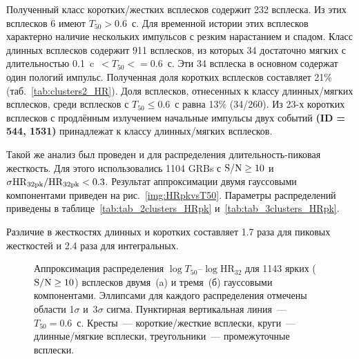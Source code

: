 Полученный класс коротких/жестких всплесков содержит 232 всплеска. Из этих 
всплесков 6 имеют $T_{50} > 0.6$~с. Для временной истории этих всплесков характерно 
наличие нескольких импульсов с резким нарастанием и спадом.  Класс длинных всплесков 
содержит 911 всплесков, из которых 34 достаточно мягких с длительностью 0.1~c~$< T_{50} <=0.6$~с. 
Эти 34 всплеска в основном содержат один пологий импульс. Полученная доля коротких 
всплесков составляет 21\% (таб.~\ref{tab:clusters2_HR}). Доля всплесков, отнесенных 
к классу длинных/мягких всплесков, среди всплесков с $T_{50} \leq 0.6$~с  равна 13\% (34/260). 
Из 23-х коротких всплесков с продлённым излучением начальные импульсы двух 
событий \textbf{(ID = 544, 1531)} принадлежат к классу длинных/мягких всплесков.

Такой же анализ был проведен и для распределения длительность-пиковая жесткость. 
Для этого использовались 1104 GRBs с ${\mathrm{S/N}} \geq 10$ и $\sigma {\mathrm{HR}}_{32{\mathrm{pk}}}/{\mathrm{HR}}_{32{\mathrm{pk}}} <0.3$. 
Результат аппроксимации двумя гауссовыми компонентами приведен на рис.~\ref{img:HRpkvsT50}. 
Параметры распределений приведены в таблице~\ref{tab:tab_2clusters_HRpk} и~\ref{tab:tab_3clusters_HRpk}. 

Различие в жесткостях длинных и коротких составляет 1.7 раза для пиковых 
жесткостей и 2.4 раза для интегральных. 



\begin{figure}[h]
  \begin{minipage}[h]{0.5\textwidth}
  \end{minipage}
  \hfill
  \begin{minipage}[h]{0.5\textwidth}
  \end{minipage}
  \caption[Аппроксимация распределения $\log T_{50}$--$\log \mbox{HR}_{32}$.]
  {Аппроксимация распределения $\log T_{50}$--$\log \mbox{HR}_{32}$ 
  для 1143 ярких (${\mathrm{S/N}} \geq 10$) всплесков двумя~(a) и тремя~(б) гауссовыми компонентами. 
  Эллипсами для каждого распределения отмечены области 1$\sigma$ и~3$\sigma$ сигма. 
  Пунктирная вертикальная линия~--- $T_{50} = 0.6$~с. Кресты~--- короткие/жесткие всплески, 
  круги~--- длинные/мягкие всплески, треугольники~--- промежуточные всплески.}
  \label{img:HRvsT50}  
\end{figure}

